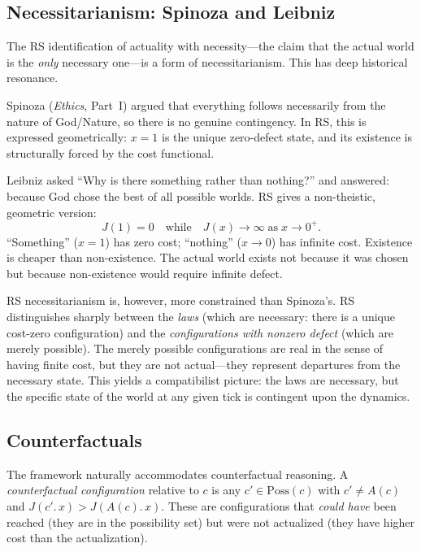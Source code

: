 \documentclass[12pt,a4paper]{article}
\theoremstyle{definition}
\theoremstyle{remark}
\begin{document}
\subsection{Necessitarianism: Spinoza and Leibniz}

The RS identification of actuality with necessity---the claim that the
actual world is the \emph{only} necessary one---is a form of
necessitarianism.  This has deep historical resonance.

Spinoza (\emph{Ethics}, Part~I) argued that everything follows
necessarily from the nature of God/Nature, so there is no genuine
contingency.  In RS, this is expressed geometrically: $x = 1$ is the
unique zero-defect state, and its existence is structurally forced by the
cost functional.

Leibniz asked ``Why is there something rather than nothing?'' and
answered: because God chose the best of all possible worlds.  RS gives
a non-theistic, geometric version:
\begin{equation}
  J(1) = 0 \quad\text{while}\quad J(x) \to \infty
  \;\text{as}\; x \to 0^+.
\end{equation}
``Something'' ($x = 1$) has zero cost; ``nothing'' ($x \to 0$) has
infinite cost.  Existence is cheaper than non-existence.  The actual
world exists not because it was chosen but because non-existence would
require infinite defect.

RS necessitarianism is, however, more constrained than Spinoza's.  RS
distinguishes sharply between the \emph{laws} (which are necessary:
there is a unique cost-zero configuration) and the
\emph{configurations with nonzero defect} (which are merely possible).
The merely possible configurations are real in the sense of having finite
cost, but they are not actual---they represent departures from the
necessary state.  This yields a compatibilist picture: the laws are
necessary, but the specific state of the world at any given tick is
contingent upon the dynamics.

\subsection{Counterfactuals}

The framework naturally accommodates counterfactual reasoning.  A
\emph{counterfactual configuration} relative to $c$ is any
$c' \in \mathrm{Poss}(c)$ with $c' \neq A(c)$ and
$J(c'.\,x) > J(A(c).\,x)$.  These are configurations that \emph{could
have} been reached (they are in the possibility set) but were not
actualized (they have higher cost than the actualization).
\end{document}
